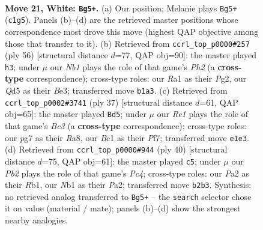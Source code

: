 \documentclass[11pt]{article}
\begin{document}
\clearpage

\begin{figure}[p]\centering
\begin{subfigure}{0.46\textwidth}\centering
\resizebox{\linewidth}{!}{%
\newchessgame
\chessboard[
  setfen={1rb2b1r/2q1k1pp/1p6/p2Qp3/3p3P/8/PP3PP1/RNB1R1K1 w - - 4 21},
  showmover=false,
  pgfstyle=straightmove, color=movearrow, markmove={c1-g5}
]}
\caption{}
\end{subfigure}\hfill
\begin{subfigure}{0.46\textwidth}\centering
\resizebox{\linewidth}{!}{%
\newchessgame
\chessboard[
  setfen={1r1q2k1/r5bp/PpQp2p1/2pPp3/8/4B3/R4PPP/1R4K1 w - - 7 29},
  showmover=false,
  pgfstyle=straightmove, color=movearrow, markmove={h2-h3}
]}
\caption{}
\end{subfigure}
\\[4pt]
\begin{subfigure}{0.46\textwidth}\centering
\resizebox{\linewidth}{!}{%
\newchessgame
\chessboard[
  setfen={r3k2r/5pp1/pBb1p2p/8/1b3qP1/5P2/1PP2Q1P/1K1R1BR1 b kq - 3 19},
  showmover=false,
  pgfstyle=straightmove, color=movearrow, markmove={c6-d5}
]}
\caption{}
\end{subfigure}\hfill
\begin{subfigure}{0.46\textwidth}\centering
\resizebox{\linewidth}{!}{%
\newchessgame
\chessboard[
  setfen={r1b1k2r/1p2bqpp/p3p3/4Qp2/2P5/3BB3/P4PPP/1R1R2K1 w kq - 1 21},
  showmover=false,
  pgfstyle=straightmove, color=movearrow, markmove={c4-c5}
]}
\caption{}
\end{subfigure}
\caption{\textbf{Move 21, White: \texttt{Bg5+}.} (a) Our position; Melanie plays \texttt{Bg5+} (\texttt{c1g5}). Panels (b)--(d) are the retrieved master positions whose correspondence most drove this move (highest QAP objective among those that transfer to it). (b) Retrieved from \texttt{ccrl\_top\_p0000\#257} (ply 56) [structural distance $d$=77, QAP obj=90]: the master played \texttt{h3}; under $\mu$ our \emph{Nb1} plays the role of that game's \emph{Ph2} (a \textbf{cross-type} correspondence); cross-type roles: our \emph{R}a1 as their \emph{P}g2, our \emph{Q}d5 as their \emph{B}e3; transferred move \texttt{b1a3}. (c) Retrieved from \texttt{ccrl\_top\_p0002\#3741} (ply 37) [structural distance $d$=61, QAP obj=65]: the master played \texttt{Bd5}; under $\mu$ our \emph{Re1} plays the role of that game's \emph{Bc3} (a \textbf{cross-type} correspondence); cross-type roles: our \emph{p}g7 as their \emph{R}a8, our \emph{B}c1 as their \emph{P}f7; transferred move \texttt{e1e3}. (d) Retrieved from \texttt{ccrl\_top\_p0000\#944} (ply 40) [structural distance $d$=75, QAP obj=61]: the master played \texttt{c5}; under $\mu$ our \emph{Pb2} plays the role of that game's \emph{Pc4}; cross-type roles: our \emph{P}a2 as their \emph{R}b1, our \emph{N}b1 as their \emph{P}a2; transferred move \texttt{b2b3}. Synthesis: no retrieved analog transferred to \texttt{Bg5+} -- the \texttt{search} selector chose it on value (material / mate); panels (b)--(d) show the strongest nearby analogies.}
\label{fig:thought-m40}
\end{figure}
\end{document}
